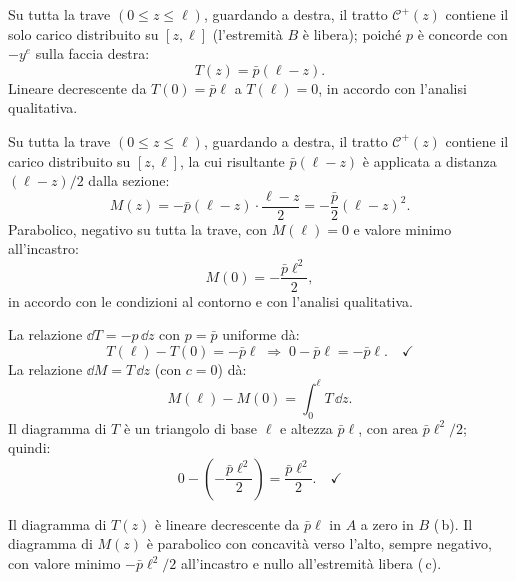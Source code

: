 \begin{esempio}
\begin{svolgimento}
		
		Su tutta la trave $(0 \leq z \leq \ell)$,
		guardando a destra, il tratto $\mathcal{C}^+(z)$
		contiene il solo carico distribuito su $[z,\ell]$
		(l'estremità $B$ è libera); poiché $p$ è
		concorde con $-y^e$ sulla faccia destra:
		\[
		T(z) = \bar{p}(\ell - z).
		\]
		Lineare decrescente da $T(0) = \bar{p}\ell$
		a $T(\ell) = 0$, in accordo con l'analisi
		qualitativa.
		
		
		Su tutta la trave $(0 \leq z \leq \ell)$,
		guardando a destra, il tratto $\mathcal{C}^+(z)$
		contiene il carico distribuito su $[z,\ell]$,
		la cui risultante $\bar{p}(\ell-z)$ è applicata
		a distanza $(\ell-z)/2$ dalla sezione:
		\[
		M(z) = -\bar{p}(\ell-z)\cdot\frac{\ell-z}{2}
		= -\frac{\bar{p}}{2}(\ell-z)^2.
		\]
		Parabolico, negativo su tutta la trave, con
		$M(\ell) = 0$ e valore minimo all'incastro:
		\[
		M(0) = -\frac{\bar{p}\ell^2}{2},
		\]
		in accordo con le condizioni al contorno e
		con l'analisi qualitativa.
		
		La relazione $\dd T = -p\,\dd z$ con $p = \bar{p}$
		uniforme dà:
		\[
		T(\ell) - T(0) = -\bar{p}\ell
		\;\Rightarrow\;
		0 - \bar{p}\ell = -\bar{p}\ell. \quad\checkmark
		\]
		La relazione $\dd M = T\,\dd z$ (con $c = 0$) dà:
		\[
		M(\ell) - M(0) = \int_0^\ell T\,\dd z.
		\]
		Il diagramma di $T$ è un triangolo di base
		$\ell$ e altezza $\bar{p}\ell$, con area
		$\bar{p}\ell^2/2$; quindi:
		\[
		0 - \left(-\frac{\bar{p}\ell^2}{2}\right)
		= \frac{\bar{p}\ell^2}{2}. \quad\checkmark
		\]
		
		\noindent
		Il diagramma di $T(z)$ è lineare decrescente
		da $\bar{p}\ell$ in $A$ a zero in $B$ (\,b).
		Il diagramma di $M(z)$ è parabolico con
		concavità verso l'alto, sempre negativo,
		con valore minimo $-\bar{p}\ell^2/2$
		all'incastro e nullo all'estremità libera (\,c).
		
	\end{svolgimento}
\end{esempio}



